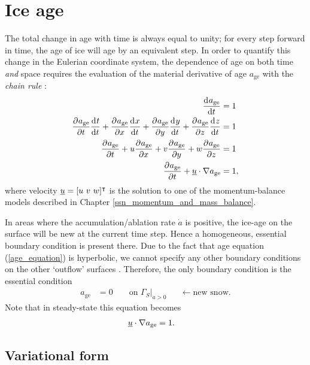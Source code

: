 
\chapter{Ice age} \label{ssn_ice_age}

The total change in age with time is always equal to unity; for every step forward in time, the age of ice will age by an equivalent step.  In order to quantify this change in the Eulerian coordinate system, the dependence of age on both time \emph{and} space requires the evaluation of the material derivative of age $a_{\text{ge}}$ with the   \emph{chain rule} : 
\begin{align}
  \label{age_equation}
  \frac{\mathrm{d}^{} a_{\text{ge}}}{\mathrm{d} t^{} } &= 1 \notag \\
  \frac{\partial^{} a_{\text{ge}}}{\partial t^{} } \frac{\mathrm{d}^{} t}{\mathrm{d} t^{} } + \frac{\partial^{} a_{\text{ge}}}{\partial x^{} } \frac{\mathrm{d}^{} x}{\mathrm{d} t^{} } + \frac{\partial^{} a_{\text{ge}}}{\partial y^{} } \frac{\mathrm{d}^{} y}{\mathrm{d} t^{} } + \frac{\partial^{} a_{\text{ge}}}{\partial z^{} } \frac{\mathrm{d}^{} z}{\mathrm{d} t^{} } &= 1 \notag \\
  \frac{\partial^{} a_{\text{ge}}}{\partial t^{} } + u \frac{\partial^{} a_{\text{ge}}}{\partial x^{} } + v \frac{\partial^{} a_{\text{ge}}}{\partial y^{} } + w \frac{\partial^{} a_{\text{ge}}}{\partial z^{} } &= 1 \notag \\
  \frac{\partial^{} a_{\text{ge}}}{\partial t^{} } + \underline{u} \cdot \nabla a_{\text{ge}} &= 1,
\end{align}
where velocity $\underline{u} = [u\ v\ w]^\intercal$ is the solution to one of the momentum-balance models described in Chapter \ref{ssn_momentum_and_mass_balance}.

In areas where the accumulation/ablation rate $\dot{a}$ is positive, the ice-age on the surface will be new at the current time step.  Hence a homogeneous, essential boundary condition is present there.  Due to the fact that age equation (\ref{age_equation}) is hyperbolic, we cannot specify any other boundary conditions on the other `outflow' surfaces \citep{hughes_1987, logan_2006}.  Therefore, the only boundary condition is the essential condition
\begin{align}
  \label{age_boundary_condition}
  a_{\text{ge}} &= 0 &&\text{ on } \Gamma_{S} \big|_{\dot{a} > 0} &&\leftarrow \text{new snow}.
\end{align}
Note that in steady-state this equation becomes
\begin{align}
  \label{ss_age_equation}
  \underline{u} \cdot \nabla a_{\text{ge}} &= 1.
\end{align}

\section{Variational form}

